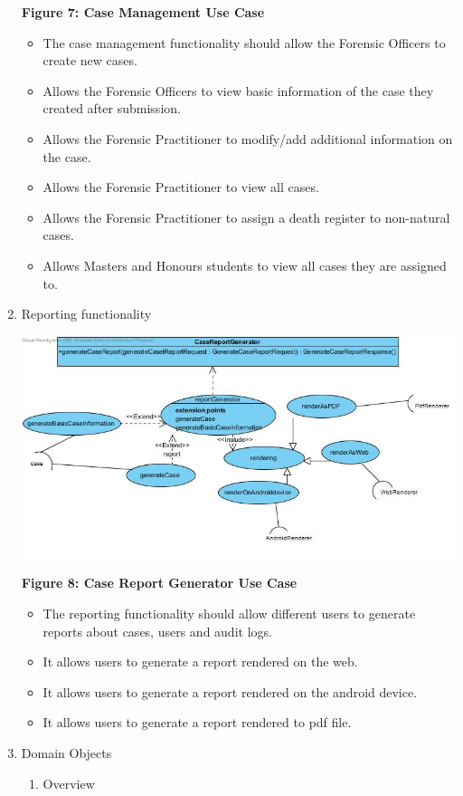 \documentclass[10pt,a4paper]{article}
\begin{document}
\begin{enumerate}
\begin{center}
		\textbf{Figure 7: Case Management Use Case}
	\end{center}
	\begin{itemize}
		\item The case management functionality should allow the Forensic Officers to create new cases.
		\item Allows the Forensic Officers to view basic information of the case they created after submission.
		\item Allows the Forensic Practitioner to modify/add additional information on the case.
		\item Allows the Forensic Practitioner to view all cases.
		\item Allows the Forensic Practitioner to assign a death register to non-natural cases.
		\item Allows Masters and Honours students to view all cases they are assigned to.
	\end{itemize}
	\item Reporting functionality
		\begin{center}
			\includegraphics[scale=0.4]{caseGeneratorReport.jpg}
			
			\textbf{Figure 8: Case Report Generator Use Case}
		\end{center}
		\begin{itemize}
			\item The reporting functionality should allow different users to generate reports about cases, users and audit logs.
			\item It allows users to generate a report rendered on the web.
			\item It allows users to generate a report rendered on the android device.
			\item It allows users to generate a report rendered to pdf file.
		\end{itemize}
	\item Domain Objects
	\begin{enumerate}
		\item Overview
\end{enumerate}
\end{enumerate}
\end{document}
